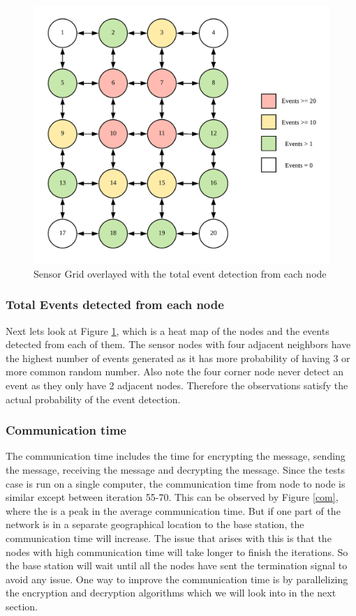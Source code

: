\documentclass[conference]{IEEEtran}
\begin{document}
	 \begin{figure}[!h]
	 	\centering
	 	\includegraphics[width=3.in,keepaspectratio]{gridsum}
	 	\caption{Sensor Grid overlayed with the total event detection from each node}
	 	\label{colgrid}
	 \end{figure}
 
	\subsubsection{Total Events detected from each node}
	Next lets look at Figure \ref{colgrid}, which is a heat map of the nodes and the events detected from each of them. The sensor nodes with four adjacent neighbors have the highest number of events generated as it has more probability of having 3 or more common random number. Also note the four corner node never 
	detect an event as they only have 2 adjacent nodes. Therefore the observations satisfy the actual probability of the event detection.
	
	\subsubsection{Communication time}
	
	The communication time includes the time for encrypting the message, sending the message, receiving the message and decrypting the message. Since the tests case is run on a single computer, the communication time from node to node is similar except between iteration 55-70. This can be observed by Figure \ref{com}, where the is a peak in the average communication time. But if one part of the network is in a separate geographical location to the base station, the communication time will increase. The issue that arises with this is that the nodes with high communication time will take longer to finish the iterations. So the base station will wait until all the nodes have sent the termination signal to avoid any issue. One way to improve the communication time is by parallelizing the encryption and decryption algorithms which we will look into in the next section.
\end{document}
